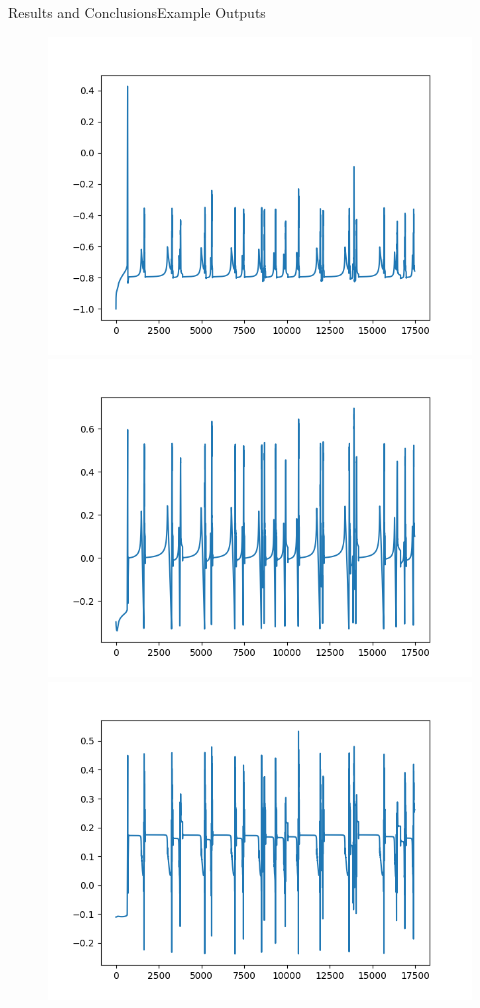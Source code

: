 \documentclass[handout]{beamer}
\begin{document}
\begin{frame}{Results and Conclusions}{Example Outputs}
\begin{center}
  \begin{figure}
  \includegraphics[scale=0.2]{images/curr1_exp13_epoch190_true}
  \includegraphics[scale=0.2]{images/curr2_exp13_epoch190_true}
  \includegraphics[scale=0.2]{images/torque_exp13_epoch190_true}\\

\end{figure}
\end{center}
\end{frame}
\end{document}
